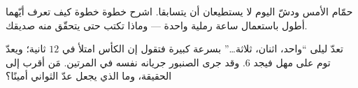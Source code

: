 \begin{exercise}[$\star\star$]\label{exo:g2:measuring-time:9}
حمّام الأمس ودشّ اليوم لا يستطيعان أن يتسابقا. اشرح خطوة خطوة
كيف تعرف أيّهما أطول باستعمال ساعة رملية واحدة --- وماذا تكتب
حتى يتحقّق منه صديقك.
\end{exercise}

\begin{exercise}[$\star\star$]\label{exo:g2:measuring-time:10}
تعدّ ليلى ``واحد، اثنان، ثلاثة\dots'' بسرعة كبيرة فتقول إن الكأس
امتلأ في $12$ ثانية؛ ويعدّ توم على مهل فيجد $6$. وقد جرى الصنبور
جريانه نفسه في المرتين. مَن أقرب إلى الحقيقة، وما الذي يجعل عدّ
الثواني أمينًا؟
\end{exercise}

